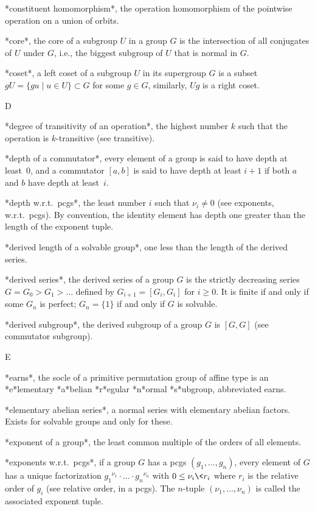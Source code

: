 *constituent homomorphism*,  the operation homomorphism of  the pointwise
operation on a union of orbits.

*core*, the core of a subgroup $U$ in a group  $G$ is the intersection of
all conjugates of $U$  under $G$, i.e., the biggest  subgroup of $U$ that
is normal in $G$.

*coset*, a left coset of a subgroup $U$ in its supergroup $G$ is a subset
$gU = \{gu\mid u\in U\}\subset G$ for some $g\in G$, similarly, $Ug$ is a
right coset.

 D

*degree  of transitivity  of an  operation*, the  highest number $k$ such
that the operation is $k$-transitive (see transitive).

*depth of a commutator*, every element of  a group is  said to have depth
at least~0, and a commutator $[a,b]$ is said to have depth at least $i+1$
if both $a$ and $b$ have depth at least~$i$.

*depth w.r.t.~pcgs*,  the least number  $i$  such that  $\nu_i\ne 0$ (see
exponents,  w.r.t.~pcgs). By  convention, the identity  element has depth
one greater than the length of the exponent tuple.

*derived length  of a solvable  group*, one  less than the  length of the
derived series.

*derived series*,  the derived  series  of a  group  $G$ is  the strictly
decreasing  series $G  = G_0   > G_1 >   \ldots$ defined   by $G_{i+1}  =
[G_i,G_i]$ for   $i\ge 0$. It  is  finite if and  only  if some  $G_n$ is
perfect; $G_n=\{1\}$ if and only if $G$ is solvable.

*derived subgroup*, the derived subgroup  of a group  $G$ is $[G,G]$ (see
commutator subgroup).

 E

*earns*, the socle of a primitive permutation group  of affine type is an
*e*lementary *a*belian *r*egular *n*ormal *s*ubgroup, abbreviated earns.

*elementary abelian  series*,   a normal series  with elementary  abelian
factors. Exists for solvable groups and only for these.

*exponent of  a group*, the least  common  multiple of the orders  of all
elements.

*exponents w.r.t.~pcgs*, if a  group $G$  has a pcgs  $(g_1,\ldots,g_n)$,
every   element of $G$  has  a  unique factorization  ${g_1}^{\nu_1}\cdot
\ldots \cdot {g_n}^{\nu_n}$  with $0\le \nu_i \< r_i$  where $r_i$ is the
relative order  of $g_i$ (see relative  order, in  a pcgs). The $n$-tuple
$(\nu_1,\ldots,\nu_n)$ is called the associated exponent tuple.


